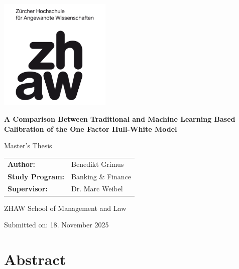 \documentclass[12pt,a4paper]{article}
\begin{document}
\begin{titlepage}
	\centering
	\vspace*{1cm}

	\includegraphics[width=0.4\textwidth]{images/zhaw_logo.png}

	\vfill

	{\Huge\bfseries A Comparison Between Traditional and Machine Learning Based Calibration of the One Factor Hull-White Model\par}

	\vspace{1.5cm}

	{\Large Master's Thesis\par}

	\vfill

	\begin{minipage}{0.8\textwidth}
		\large
		\begin{tabular}{@{}ll}
			\textbf{Author:}        & Benedikt Grimus    \\
			\addlinespace[1em]
			\textbf{Study Program:} & Banking \& Finance \\
			\addlinespace[1em]
			\textbf{Supervisor:}    & Dr. Marc Weibel    \\
		\end{tabular}
	\end{minipage}

	\vfill

	{\large
		ZHAW School of Management and Law\par
		Submitted on: 18. November 2025\par
	}

	\vspace*{1cm}

\end{titlepage}

\clearpage

\clearpage
\section*{Abstract}

\clearpage
\end{document}
